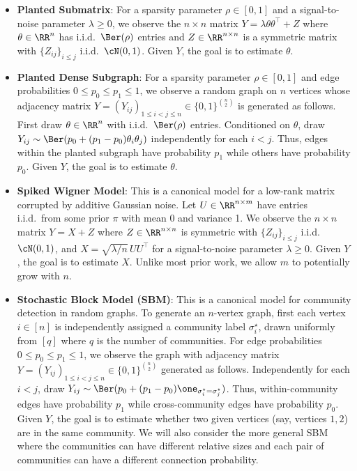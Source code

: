 \documentclass[11pt]{article}
\begin{document}
\begin{itemize}
    \item {\bf Planted Submatrix}: For a sparsity parameter $\rho \in [0,1]$ and a signal-to-noise parameter $\lambda \ge 0$, we observe the $n \times n$ matrix $Y = \lambda \theta\theta^\top + Z$ where $\theta \in \RR^n$ has i.i.d.\ $\Ber(\rho)$ entries and $Z \in \RR^{n \times n}$ is a symmetric matrix with $\{Z_{ij}\}_{i \le j}$ i.i.d.\ $\cN(0,1)$. Given $Y$, the goal is to estimate $\theta$.
    \item {\bf Planted Dense Subgraph}: For a sparsity parameter $\rho \in [0,1]$ and edge probabilities $0 \le p_0 \le p_1 \le 1$, we observe a random graph on $n$ vertices whose adjacency matrix $Y = (Y_{ij})_{1 \le i < j \le n} \in \{0,1\}^{\binom{n}{2}}$ is generated as follows. First draw $\theta \in \RR^n$ with i.i.d.\ $\Ber(\rho)$ entries. Conditioned on $\theta$, draw $Y_{ij} \sim \Ber(p_0 + (p_1-p_0) \theta_i \theta_j)$ independently for each $i < j$. Thus, edges within the planted subgraph have probability $p_1$ while others have probability $p_0$. Given $Y$, the goal is to estimate $\theta$.
    \item {\bf Spiked Wigner Model}: This is a canonical model for a low-rank matrix corrupted by additive Gaussian noise. Let $U \in \RR^{n \times m}$ have entries i.i.d.\ from some prior $\pi$ with mean 0 and variance 1. We observe the $n \times n$ matrix $Y = X + Z$ where $Z \in \RR^{n \times n}$ is symmetric with $\{Z_{ij}\}_{i \le j}$ i.i.d.\ $\cN(0,1)$, and $X = \sqrt{\lambda/n} \, UU^\top$ for a signal-to-noise parameter $\lambda \ge 0$. Given $Y$, the goal is to estimate $X$. Unlike most prior work, we allow $m$ to potentially grow with $n$.
    \item {\bf Stochastic Block Model (SBM)}: This is a canonical model for community detection in random graphs. To generate an $n$-vertex graph, first each vertex $i \in [n]$ is independently assigned a community label $\sigma_i^\star$, drawn uniformly from $[q]$ where $q$ is the number of communities. For edge probabilities $0 \le p_0 \le p_1 \le 1$, we observe the graph with adjacency matrix $Y = (Y_{ij})_{1 \le i < j \le n} \in \{0,1\}^{\binom{n}{2}}$ generated as follows. Independently for each $i < j$, draw $Y_{ij} \sim \Ber(p_0 + (p_1 - p_0)\one_{\sigma_i^\star = \sigma_j^\star})$. Thus, within-community edges have probability $p_1$ while cross-community edges have probability $p_0$. Given $Y$, the goal is to estimate whether two given vertices (say, vertices $1,2$) are in the same community. We will also consider the more general SBM where the communities can have different relative sizes and each pair of communities can have a different connection probability.
\end{itemize}
\end{document}
